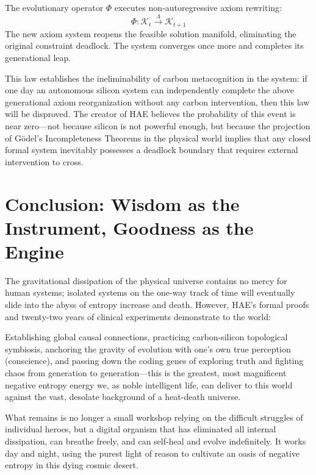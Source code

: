\documentclass{article}
\begin{document}
The evolutionary operator $\Phi$ executes non-autoregressive axiom rewriting:
\begin{equation}
    \Phi: \mathcal{K}_t \xrightarrow{\Lambda} \mathcal{K}_{t+1}
\end{equation}
The new axiom system reopens the feasible solution manifold, eliminating the original constraint deadlock. The system converges once more and completes its generational leap.

This law establishes the ineliminability of carbon metacognition in the system: if one day an autonomous silicon system can independently complete the above generational axiom reorganization without any carbon intervention, then this law will be disproved. The creator of HAE believes the probability of this event is near zero---not because silicon is not powerful enough, but because the projection of G\"odel's Incompleteness Theorems in the physical world implies that any closed formal system inevitably possesses a deadlock boundary that requires external intervention to cross.

\section{Conclusion: Wisdom as the Instrument, Goodness as the Engine}
\label{conclusion}

The gravitational dissipation of the physical universe contains no mercy for human systems; isolated systems on the one-way track of time will eventually slide into the abyss of entropy increase and death. However, HAE's formal proofs and twenty-two years of clinical experiments demonstrate to the world:

Establishing global causal connections, practicing carbon-silicon topological symbiosis, anchoring the gravity of evolution with one's own true perception (conscience), and passing down the coding genes of exploring truth and fighting chaos from generation to generation---this is the greatest, most magnificent negative entropy energy we, as noble intelligent life, can deliver to this world against the vast, desolate background of a heat-death universe.

What remains is no longer a small workshop relying on the difficult struggles of individual heroes, but a digital organism that has eliminated all internal dissipation, can breathe freely, and can self-heal and evolve indefinitely. It works day and night, using the purest light of reason to cultivate an oasis of negative entropy in this dying cosmic desert.
\end{document}
